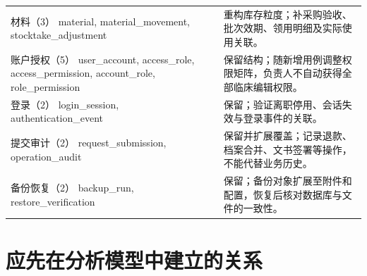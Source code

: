 \documentclass[UTF8,a4paper,zihao=-4,fontset=none]{ctexart}
\begin{document}
{\begin{longtable}{@{}p{6.0cm}p{9.8cm}@{}}
\raggedright\arraybackslash 材料（3）
material, material\_\allowbreak{}movement, stocktake\_\allowbreak{}adjustment & \raggedright\arraybackslash 重构库存粒度；补采购验收、批次效期、领用明细及实际使用关联。 \\[4pt]
\raggedright\arraybackslash 账户授权（5）
user\_\allowbreak{}account, access\_\allowbreak{}role, access\_\allowbreak{}permission, account\_\allowbreak{}role, role\_\allowbreak{}permission & \raggedright\arraybackslash 保留结构；随新增用例调整权限矩阵，负责人不自动获得全部临床编辑权限。 \\[4pt]
\raggedright\arraybackslash 登录（2）
login\_\allowbreak{}session, authentication\_\allowbreak{}event & \raggedright\arraybackslash 保留；验证离职停用、会话失效与登录事件的关联。 \\[4pt]
\raggedright\arraybackslash 提交审计（2）
request\_\allowbreak{}submission, operation\_\allowbreak{}audit & \raggedright\arraybackslash 保留并扩展覆盖；记录退款、档案合并、文书签署等操作，不能代替业务历史。 \\[4pt]
\raggedright\arraybackslash 备份恢复（2）
backup\_\allowbreak{}run, restore\_\allowbreak{}verification & \raggedright\arraybackslash 保留；备份对象扩展至附件和配置，恢复后核对数据库与文件的一致性。 \\[4pt]
\bottomrule
\end{longtable}
}
\clearpage\section{应先在分析模型中建立的关系}
\end{document}

